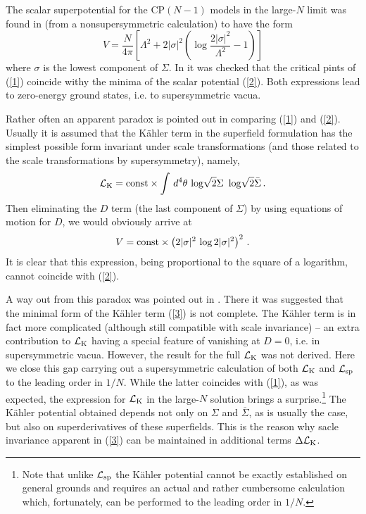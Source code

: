 \documentclass[epsfig,12pt]{article}
\def\beq{\begin{equation}}
\def\eeq{\end{equation}}
\begin{document}
The scalar superpotential for the CP$(N-1)$ models in the large-$N$ limit was  found in \cite{SYhet,BSYhet} 
(from a nonsupersymmetric calculation) to have the form
\beq
V= \frac{N}{4\pi}\left[\Lambda^2 + 2|\sigma|^2\left(\log \frac{2|\sigma|^2}{\Lambda^2}
-1\right)\right]
\label{2}
\eeq
where $\sigma$ is the lowest component of $\Sigma$. In \cite{BSYhet} it was checked that the critical pints of (\ref{1})
coincide withy the minima of the scalar potential (\ref{2}). Both expressions lead to zero-energy ground states, i.e.  to supersymmetric vacua.

Rather often an apparent paradox is pointed out in comparing (\ref{1}) and (\ref{2}). Usually it is assumed that the 
K\"ahler term in the superfield formulation has the simplest possible form invariant under scale transformations (and those related to the scale transformations by supersymmetry),
namely,
\beq
{\mathcal L}_{\rm K} = {\rm const} \times  \int\, d^4 \theta\, \log \!\sqrt{2}\Sigma\,\,  \log\! \sqrt{2}\bar\Sigma\,.
\label{3}
\eeq
Then eliminating the $D$ term (the last component of $\Sigma$) by using equations of motion for $D$,
we would obviously arrive at
\beq
V = {\rm const} \times\left( {2} |\sigma|^2\, \log {2} |\sigma|^2\right)^2\,.
\eeq
It is clear that this expression, being proportional to the square of a logarithm, cannot coincide
with (\ref{2}). 

A way out from this paradox was pointed out in  \cite{BSYhet}. There it was suggested that the minimal  form of the 
K\"ahler term (\ref{3}) is not complete. The K\"ahler term is in fact more complicated (although still compatible with scale invariance) --  an extra contribution to ${\mathcal L}_{\rm K}$ having a special feature of vanishing at $D=0$, i.e. in supersymmetric vacua. However, the result for the full ${\mathcal L}_{\rm K}$ was not derived.
Here we close this gap carrying out a supersymmetric calculation of both ${\mathcal L}_{\rm K}$ and 
${\mathcal L}_{\rm sp}$ to the leading order in $1/N$. While the latter coincides with (\ref{1}), as was expected,
the expression for ${\mathcal L}_{\rm K}$ in the large-$N$ solution brings a surprise.\footnote{
Note that unlike ${\mathcal L}_{\rm sp}$
the K\"ahler potential cannot be exactly established on general grounds and requires an actual and rather cumbersome calculation which, fortunately, can be performed to the  leading order in $1/N$.
} The K\"ahler potential obtained depends not only on $\Sigma$ and $\overline\Sigma$, as is usually the case,  but also on superderivatives of these superfields.  This is the reason why sacle invariance apparent in (\ref{3}) can be maintained in additional terms $\Delta {\mathcal L}_{\rm K}$.
\end{document}
